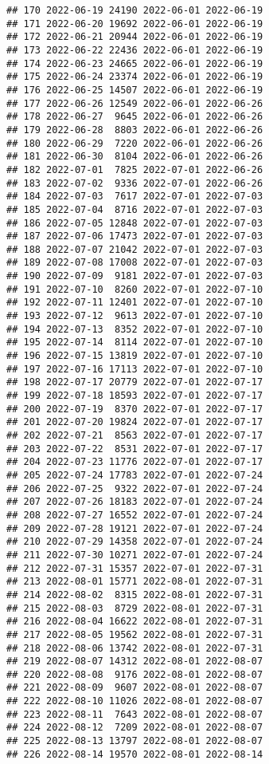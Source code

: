\documentclass[
]{article}
\begin{document}
\begin{verbatim}
## 170 2022-06-19 24190 2022-06-01 2022-06-19
## 171 2022-06-20 19692 2022-06-01 2022-06-19
## 172 2022-06-21 20944 2022-06-01 2022-06-19
## 173 2022-06-22 22436 2022-06-01 2022-06-19
## 174 2022-06-23 24665 2022-06-01 2022-06-19
## 175 2022-06-24 23374 2022-06-01 2022-06-19
## 176 2022-06-25 14507 2022-06-01 2022-06-19
## 177 2022-06-26 12549 2022-06-01 2022-06-26
## 178 2022-06-27  9645 2022-06-01 2022-06-26
## 179 2022-06-28  8803 2022-06-01 2022-06-26
## 180 2022-06-29  7220 2022-06-01 2022-06-26
## 181 2022-06-30  8104 2022-06-01 2022-06-26
## 182 2022-07-01  7825 2022-07-01 2022-06-26
## 183 2022-07-02  9336 2022-07-01 2022-06-26
## 184 2022-07-03  7617 2022-07-01 2022-07-03
## 185 2022-07-04  8716 2022-07-01 2022-07-03
## 186 2022-07-05 12848 2022-07-01 2022-07-03
## 187 2022-07-06 17473 2022-07-01 2022-07-03
## 188 2022-07-07 21042 2022-07-01 2022-07-03
## 189 2022-07-08 17008 2022-07-01 2022-07-03
## 190 2022-07-09  9181 2022-07-01 2022-07-03
## 191 2022-07-10  8260 2022-07-01 2022-07-10
## 192 2022-07-11 12401 2022-07-01 2022-07-10
## 193 2022-07-12  9613 2022-07-01 2022-07-10
## 194 2022-07-13  8352 2022-07-01 2022-07-10
## 195 2022-07-14  8114 2022-07-01 2022-07-10
## 196 2022-07-15 13819 2022-07-01 2022-07-10
## 197 2022-07-16 17113 2022-07-01 2022-07-10
## 198 2022-07-17 20779 2022-07-01 2022-07-17
## 199 2022-07-18 18593 2022-07-01 2022-07-17
## 200 2022-07-19  8370 2022-07-01 2022-07-17
## 201 2022-07-20 19824 2022-07-01 2022-07-17
## 202 2022-07-21  8563 2022-07-01 2022-07-17
## 203 2022-07-22  8531 2022-07-01 2022-07-17
## 204 2022-07-23 11776 2022-07-01 2022-07-17
## 205 2022-07-24 17783 2022-07-01 2022-07-24
## 206 2022-07-25  9322 2022-07-01 2022-07-24
## 207 2022-07-26 18183 2022-07-01 2022-07-24
## 208 2022-07-27 16552 2022-07-01 2022-07-24
## 209 2022-07-28 19121 2022-07-01 2022-07-24
## 210 2022-07-29 14358 2022-07-01 2022-07-24
## 211 2022-07-30 10271 2022-07-01 2022-07-24
## 212 2022-07-31 15357 2022-07-01 2022-07-31
## 213 2022-08-01 15771 2022-08-01 2022-07-31
## 214 2022-08-02  8315 2022-08-01 2022-07-31
## 215 2022-08-03  8729 2022-08-01 2022-07-31
## 216 2022-08-04 16622 2022-08-01 2022-07-31
## 217 2022-08-05 19562 2022-08-01 2022-07-31
## 218 2022-08-06 13742 2022-08-01 2022-07-31
## 219 2022-08-07 14312 2022-08-01 2022-08-07
## 220 2022-08-08  9176 2022-08-01 2022-08-07
## 221 2022-08-09  9607 2022-08-01 2022-08-07
## 222 2022-08-10 11026 2022-08-01 2022-08-07
## 223 2022-08-11  7643 2022-08-01 2022-08-07
## 224 2022-08-12  7209 2022-08-01 2022-08-07
## 225 2022-08-13 13797 2022-08-01 2022-08-07
## 226 2022-08-14 19570 2022-08-01 2022-08-14

\end{verbatim}
\end{document}
